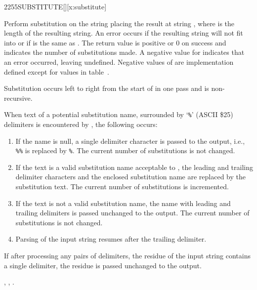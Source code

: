\begin{worddef}{2255}{SUBSTITUTE}[][x:substitute]
\item {}

	Perform substitution on the string  placing
	the result at string , where  is
	the length of the resulting string.
	An error occurs if the resulting string will not fit into
	 or if  is the same as .
	The return value  is positive or 0 on success and indicates the
	number of substitutions made.
	A negative value for  indicates that an error occurred, leaving
	 undefined.
	Negative values of  are implementation defined except for
	values in table~.

	Substitution occurs left to right from the start of 
	in one pass and is non-recursive.

	When text of a potential substitution name, surrounded by `\texttt{\%}' (ASCII \$25) delimiters
	is encountered by , the following occurs:

	\begin{enumerate}
	\item If the name is null, a single delimiter character is passed
		to the output, i.e., \texttt{\%\%} is replaced by \texttt{\%}.
		The current number of substitutions is not changed.

	\item If the text is a valid substitution name acceptable to
		, the leading and trailing delimiter
		characters and the enclosed substitution name are replaced by
		the substitution text.  The current number of substitutions
		is incremented.

	\item If the text is not a valid substitution name, the name with
		leading	and trailing delimiters is passed unchanged to the
		output.  The current number of substitutions is not changed.

	\item Parsing of the input string resumes after the trailing delimiter.
	\end{enumerate}

	If after processing any pairs of delimiters, the residue of the input string contains
	a single delimiter, the residue is passed unchanged to the output.

\see {}, , .


\end{worddef}
